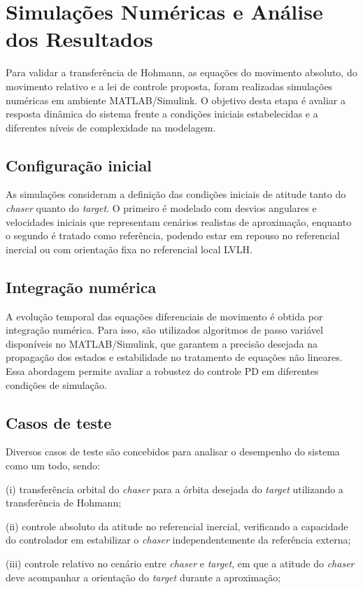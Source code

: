 \section{Simulações Numéricas e Análise dos Resultados}
Para validar a transferência de Hohmann, as equações do movimento absoluto, do movimento relativo e a lei de controle proposta, foram realizadas simulações numéricas em ambiente MATLAB/Simulink.
O objetivo desta etapa é avaliar a resposta dinâmica do sistema frente a condições iniciais estabelecidas e a diferentes níveis de complexidade na modelagem.

\subsection{Configuração inicial}
As simulações consideram a definição das condições iniciais de atitude tanto do \emph{chaser} quanto do \emph{target}. O primeiro é modelado com desvios angulares e velocidades iniciais que representam cenários realistas de aproximação, enquanto o segundo é tratado como referência, podendo estar em repouso no referencial inercial ou com orientação fixa no referencial local LVLH.

\subsection{Integração numérica}
A evolução temporal das equações diferenciais de movimento é obtida por integração numérica. Para isso, são utilizados algoritmos de passo variável disponíveis no MATLAB/Simulink, que garantem a precisão desejada na propagação dos estados e estabilidade no tratamento de equações não lineares. Essa abordagem permite avaliar a robustez do controle PD em diferentes condições de simulação.

\subsection{Casos de teste}
Diversos casos de teste são concebidos para analisar o desempenho do sistema como um todo, sendo:

(i) transferência orbital do \emph{chaser} para a órbita desejada do \emph{target} utilizando a transferência de Hohmann;

(ii) controle absoluto da atitude no referencial inercial, verificando a capacidade do controlador em estabilizar o \emph{chaser} independentemente da referência externa;

(iii) controle relativo no cenário entre \emph{chaser} e \emph{target}, em que a atitude do \emph{chaser} deve acompanhar a orientação do \emph{target} durante a aproximação;

